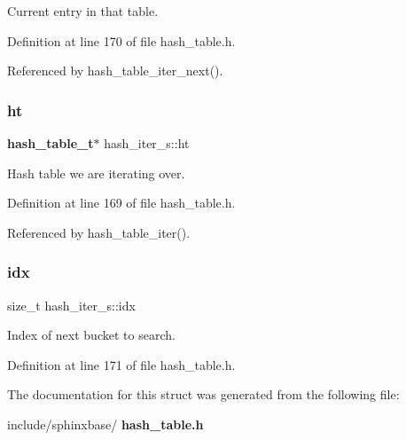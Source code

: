 Current entry in that table. 



Definition at line 170 of file hash\+\_\+table.\+h.



Referenced by hash\+\_\+table\+\_\+iter\+\_\+next().

\mbox{\label{structhash__iter__s_a02844d3426aaa62e41086c98a052ed7d}} 
\subsubsection{ht}
{\footnotesize\ttfamily \textbf{ hash\+\_\+table\+\_\+t}$\ast$ hash\+\_\+iter\+\_\+s\+::ht}



Hash table we are iterating over. 



Definition at line 169 of file hash\+\_\+table.\+h.



Referenced by hash\+\_\+table\+\_\+iter().

\mbox{\label{structhash__iter__s_a9cb2842206d721ef3ef9b15c133ba3c9}} 
\subsubsection{idx}
{\footnotesize\ttfamily size\+\_\+t hash\+\_\+iter\+\_\+s\+::idx}



Index of next bucket to search. 



Definition at line 171 of file hash\+\_\+table.\+h.



The documentation for this struct was generated from the following file\+:\begin{DoxyCompactItemize}
\item 
include/sphinxbase/\textbf{ hash\+\_\+table.\+h}\end{DoxyCompactItemize}
